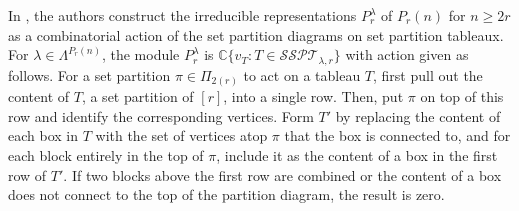 \documentclass[ALCO,Unicode,published]{cedram}
\newcommand{\C}{\mathbb{C}}
\newcommand{\SSPT}{\mathcal{SSPT}}
\begin{document}
In \cite{Halverson2018SetpartitionTA}, the authors construct the irreducible representations $P_r^\lambda$ of $P_r(n)$ for $n\geq 2r$ as a combinatorial action of the set partition diagrams on set partition tableaux. For $\lambda\in\Lambda^{P_r(n)}$, the module $P_r^\lambda$ is $\C\{v_T:T\in\SSPT_{\lambda,r}\}$ with action given as follows. For a set partition $\pi\in\Pi_{2(r)}$ to act on a tableau $T$, first pull out the content of $T$, a set partition of $[r]$, into a single row. Then, put $\pi$ on top of this row and identify the corresponding vertices. Form $T'$ by replacing the content of each box in $T$ with the set of vertices atop $\pi$ that the box is connected to, and for each block entirely in the top of $\pi$, include it as the content of a box in the first row of $T'$. If two blocks above the first row are combined or the content of a box does not connect to the top of the partition diagram, the result is zero.
\end{document}
